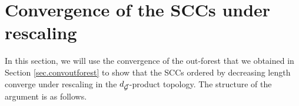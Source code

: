 \section{Convergence of the SCCs under rescaling}\label{sec.convSCCs}

In this section, we will use the convergence of the out-forest that we obtained in Section \ref{sec.convoutforest} to show that the SCCs ordered by decreasing length converge under rescaling in the $d_{\vec{{\mathcal G}}}$-product topology. The structure of the argument is as follows. 


